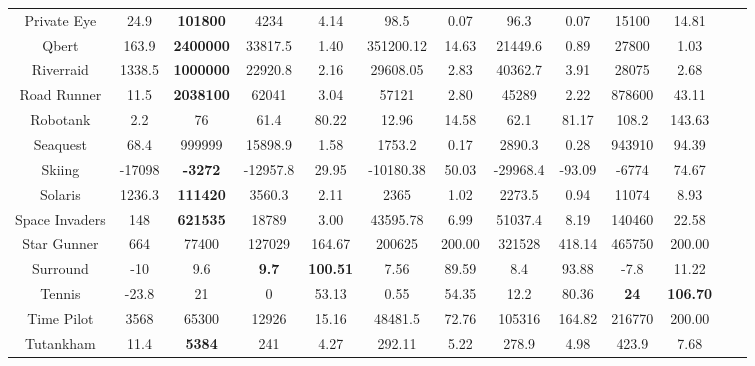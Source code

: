 \documentclass[nohyperref]{article}
\newcommand{\best}[1]{\textbf{#1}}
\theoremstyle{plain}
\begin{document}
\begin{table}[!hb]
\begin{center}
\begin{tabular}{ |c |c |c| c c| c c|  c c |c c |c c |}
 Private Eye        & 24.9      & \textbf{101800}    & 4234     &4.14    & 98.5       & 0.07       & 96.3    & 0.07      &15100      &14.81                 \\
 Qbert              & 163.9     & \textbf{2400000}   & 33817.5  &1.40    & 351200.12  & 14.63      & 21449.6 & 0.89      &27800             &1.03            \\
 Riverraid          & 1338.5    & \textbf{1000000}   & 22920.8  &2.16    & 29608.05   & 2.83       & 40362.7 & 3.91      &28075             &2.68           \\
 Road Runner        & 11.5      & \textbf{2038100}   & 62041    &3.04    & 57121      & 2.80       & 45289   & 2.22      &878600    &43.11                  \\
 Robotank           & 2.2       & 76                 & 61.4     &80.22   & 12.96      & 14.58      & 62.1    & 81.17     &108.2      &143.63   \\
 Seaquest           & 68.4      & 999999             & 15898.9  &1.58    & 1753.2     & 0.17       & 2890.3  & 0.28      &943910	             &94.39 \\
 Skiing             & -17098    & \textbf{-3272}     & -12957.8 &29.95   & -10180.38  & 50.03      & -29968.4& -93.09    &-6774             &74.67            \\
 Solaris            & 1236.3    & \textbf{111420}    & 3560.3   &2.11    & 2365       & 1.02       & 2273.5  & 0.94      &11074             &8.93           \\
 Space Invaders     & 148       & \textbf{621535 }   & 18789    &3.00    & 43595.78   & 6.99       & 51037.4 & 8.19      &140460    &22.58                  \\
 Star Gunner        & 664       & 77400              & 127029   &164.67  & 200625     & 200.00     & 321528  & 418.14    &465750     &200.00    \\
 Surround           & -10       & 9.6                & \textbf{9.7}      &\textbf{100.51}  & 7.56       & 89.59      & 8.4     & 93.88     &-7.8    &11.22  \\
 Tennis             & -23.8     & 21                 & 0        &53.13   & 0.55       & 54.35      & 12.2    & 80.36     &\best{24       }  &\best{106.70    }    \\
 Time Pilot         & 3568      & 65300              & 12926    &15.16   & 48481.5    & 72.76      & 105316  & 164.82    &216770     &200.00  \\
 Tutankham          & 11.4      & \textbf{5384}      & 241      &4.27    & 292.11     & 5.22       & 278.9   & 4.98      &423.9     &7.68                   \\

\end{tabular}
\end{center}
\end{table}
\end{document}
